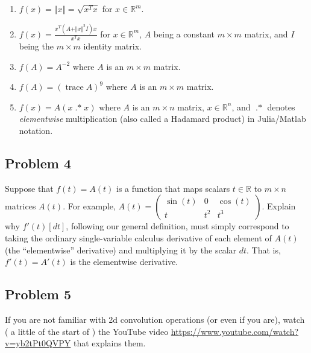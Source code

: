 \documentclass[10pt,oneside]{article}
\newcommand{\tr}{\operatorname{trace}}
\newcommand{\dotstar}{\operatorname{.*}}
\begin{document}
\begin{enumerate}

\item $f(x) = \Vert x \Vert = \sqrt{x^T x}$ for $x \in \mathbb{R}^m$.

\item $f(x) = \frac{x^T (A + \Vert x \Vert^2 I) x}{x^T x}$ for $x \in \mathbb{R}^m$, $A$ being a constant $m \times m$ matrix, and $I$ being the $m \times m$ identity matrix.

\item $f(A) = A^{-2}$ where $A$ is an $m \times m$ matrix.

\item $f(A) = (\tr A)^9$ where $A$ is an $m \times m$ matrix.

\item $f(x) = A (x \dotstar x)$ where $A$ is an $m \times n$ matrix, $x \in \mathbb{R}^n$, and $\dotstar$ denotes \emph{elementwise} multiplication (also called a Hadamard product) in Julia/Matlab notation. 

\end{enumerate}
 
\subsection*{Problem 4}

Suppose that $f(t) = A(t)$ is a function that maps scalars $t \in \mathbb{R}$ to $m \times n$ matrices $A(t)$.  For example, $A(t) = \begin{pmatrix} \sin(t) & 0 & \cos(t) \\ t & t^2 & t^3 \end{pmatrix}$.   Explain why $f'(t)[dt]$, following our general definition, must simply correspond to taking the ordinary single-variable calculus derivative of each element of $A(t)$ (the ``elementwise'' derivative) and multiplying it by the scalar $dt$.  That is, $f'(t) = A'(t)$ is the elementwise derivative.
 
\subsection*{Problem 5}

If you are not familiar  with 2d convolution operations (or even if you are), watch ( a little of the start of  ) the 
YouTube video   \url{https://www.youtube.com/watch?v=yb2tPt0QVPY} that explains them.
\end{document}
